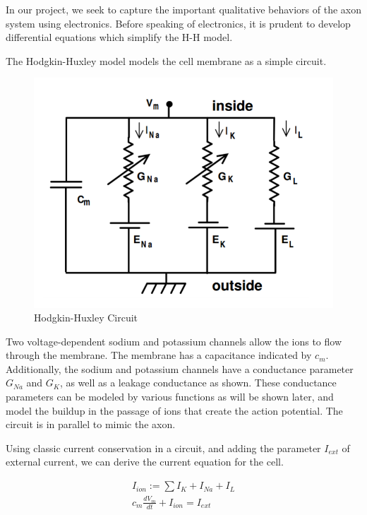 \documentclass[12]{book}
\newcommand\0{\mathbf{0}}
\newcommand\<{\langle}
\renewcommand\>{\rangle}
\begin{document}
In our project, we seek to capture the important qualitative behaviors of the axon system using electronics. Before speaking of electronics, it is prudent to develop differential equations which simplify the H-H model.

The Hodgkin-Huxley model models the cell membrane as a simple circuit. 

\begin{figure}[H]
    \centering
    \includegraphics[scale=0.5]{hhmodel}
    \caption{Hodgkin-Huxley Circuit}
    \label{fig:my_label}
\end{figure}

Two voltage-dependent sodium and potassium channels allow the ions to flow through the membrane. The membrane has a capacitance indicated by $c_m$. Additionally, the sodium and potassium channels have a conductance parameter $G_{Na}$ and $G_K$, as well as a leakage conductance as shown. These conductance parameters can be modeled by various functions as will be shown later, and model the buildup in the passage of ions that create the action potential. The circuit is in parallel to mimic the axon. 

Using classic current conservation in a circuit, and adding the parameter $I_{ext}$ of external current, we can derive the current equation for the cell.

\begin{align*}
I_{ion} := \sum I_{K} + I_{Na} + I_L \\
    c_m\frac{dV_m}{dt} + I_{ion} = I_{ext}
\end{align*}
\end{document}
